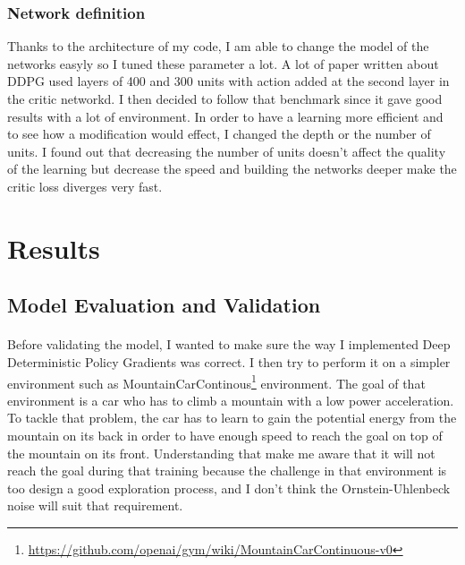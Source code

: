 \documentclass{article}
\begin{document}
\subsubsection{Network definition} 

Thanks to the architecture of my code, I am able to change the model of the networks easyly so I
tuned these parameter a lot. A lot of paper written about DDPG \cite{journals/corr/LillicrapHPHETS15}
\cite{DBLP:journals/corr/abs-1801-10425} used layers of 400 and 300 units with action added at the second
layer in the critic networkd. I then decided to follow that benchmark since it gave good results with
a lot of environment. In order to have a learning more efficient and to see how a modification would effect,
I changed the depth or the number of units. I found out that decreasing the number of units doesn't affect
the quality of the learning but decrease the speed and building the networks deeper make the critic loss
diverges very fast.

\section{Results}

\subsection{Model Evaluation and Validation}

\paragraph{}
Before validating the model, I wanted to make sure the way I implemented Deep
Deterministic Policy Gradients was correct. I then try to perform it on a
simpler environment such as
MountainCarContinous\footnote{\url{https://github.com/openai/gym/wiki/MountainCarContinuous-v0}}
environment. The goal of that environment is a car who has to climb a mountain
with a low power acceleration. To tackle that problem, the car has to learn to
gain the potential energy from the mountain on its back in order to have enough
speed to reach the goal on top of the mountain on its front. Understanding that
make me aware that it will not reach the goal during that training because the
challenge in that environment is too design a good exploration process, and I
don't think the Ornstein-Uhlenbeck noise will suit that requirement.
\end{document}
